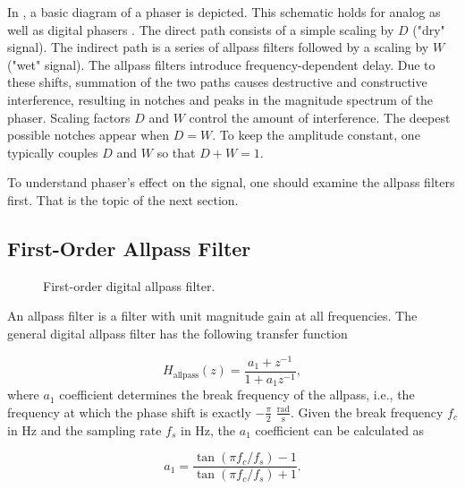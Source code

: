In , a basic diagram of a phaser is depicted. This schematic holds for analog as well as digital phasers \cite{PASPWEB2010}. The direct path consists of a simple scaling by $D$ ("dry" signal). The indirect path is a series of allpass filters followed by a scaling by $W$ ("wet" signal). The allpass filters introduce frequency-dependent delay. Due to these shifts, summation of the two paths causes destructive and constructive interference, resulting in notches and peaks in the magnitude spectrum of the phaser. Scaling factors $D$ and $W$ control the amount of interference. The deepest possible notches appear when $D = W$. To keep the amplitude constant, one typically couples $D$ and $W$ so that $D + W = 1$.

To understand phaser's effect on the signal, one should examine the allpass filters first. That is the topic of the next section.

\subsection{First-Order Allpass Filter}
\label{sec:first_order_allpass_filter}
\begin{figure}
    \centering
    \vspace{2mm}
    
    \caption{First-order digital allpass filter.}
    \label{fig:first_order_allpass_filter}
\end{figure}

An allpass filter is a filter with unit magnitude gain at all frequencies. The general digital allpass filter has the following transfer function \cite{Zoelzer2011,PASPWEB2010,Kiiski2016}

\begin{equation}
    H_\text{allpass}(z) = \frac{a_1 + z^{-1}}{1 + a_1 z^{-1}},
    \label{eq:allpass_transfer_function}
\end{equation}
where $a_1$ coefficient determines the break frequency of the allpass, i.e., the frequency at which the phase shift is exactly $-\frac{\pi}{2}$ $\frac{\text{rad}}{\text{s}}$. Given the break frequency $f_c$ in Hz and the sampling rate $f_s$ in Hz, the $a_1$ coefficient can be calculated as

\begin{equation}
    a_1 = \frac{\tan (\pi f_c / f_s) - 1}{\tan(\pi f_c / f_s) + 1}.
    \label{eq:allpass_coefficient}
\end{equation}

